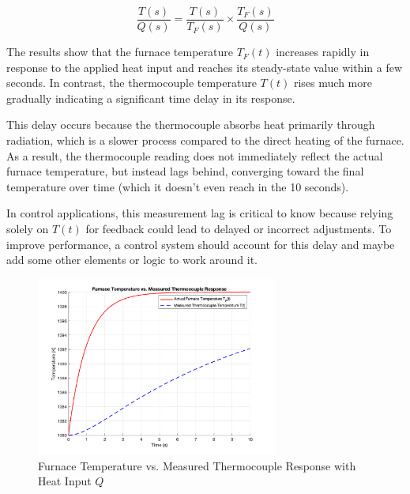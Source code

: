 \documentclass[12pt]{article}
\begin{document}
\begin{enumerate}
\begin{enumerate}
    \[
    \frac{T(s)}{Q(s)} = \frac{T(s)}{T_F(s)} \times \frac{T_F(s)}{Q(s)}
    \]

    The results show that the furnace temperature \( T_F(t) \) increases rapidly in response to the applied heat input and reaches its steady-state value within a few seconds. In contrast, the thermocouple temperature \( T(t) \) rises much more gradually indicating a significant time delay in its response. 

    This delay occurs because the thermocouple absorbs heat primarily through radiation, which is a slower process compared to the direct heating of the furnace. As a result, the thermocouple reading does not immediately reflect the actual furnace temperature, but instead lags behind, converging toward the final temperature over time (which it doesn't even reach in the 10 seconds).

    In control applications, this measurement lag is critical to know because relying solely on \( T(t) \) for feedback could lead to delayed or incorrect adjustments. To improve performance, a control system should account for this delay and maybe add some other elements or logic to work around it.

    \begin{figure}[H]
      \centering
      \includegraphics[width=0.7\textwidth]{Figures/figure2-5.png}
      \caption{Furnace Temperature vs. Measured Thermocouple Response with Heat Input \( Q \)}
      \label{fig:figure25} 
    \end{figure}    

  \end{enumerate}

\end{enumerate}
\end{document}
